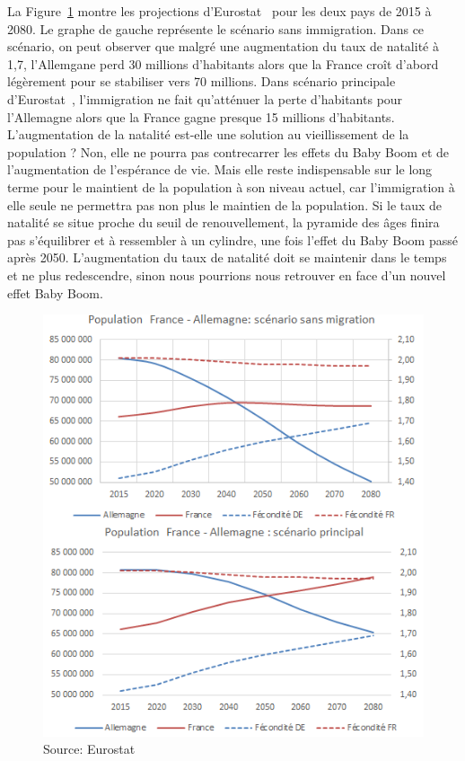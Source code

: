 La Figure~\ref{FR-DE_natalite.png} montre les projections d’Eurostat~\citep{eurostat_europop13} pour les deux pays de 2015 à 2080. Le graphe de gauche représente le scénario sans immigration. Dans ce scénario, on peut observer que malgré une augmentation du taux de natalité à 1,7, l’Allemgane perd 30 millions d’habitants alors que la France croît d’abord légèrement pour se stabiliser vers 70 millions. Dans scénario principale d'Eurostat~\citep{eurostat_europop13}, l'immigration ne fait qu’atténuer la perte d’habitants pour l’Allemagne alors que la France gagne presque 15 millions d’habitants. L’augmentation de la natalité est-elle une solution au vieillissement de la population ? Non, elle ne pourra pas contrecarrer les effets du Baby Boom et de l’augmentation de l’espérance de vie. Mais elle reste indispensable sur le long terme pour le maintient de la population à son niveau actuel, car l’immigration à elle seule ne permettra pas non plus le maintien de la population. Si le taux de natalité se situe proche du seuil de renouvellement, la pyramide des âges finira pas s'équilibrer et à ressembler à un cylindre, une fois l’effet du Baby Boom passé après 2050. L’augmentation du taux de natalité doit se maintenir dans le temps et ne plus redescendre, sinon nous pourrions nous retrouver en face d’un nouvel effet Baby Boom. 
\newpage
\begin{figure}[h!]
    \begin{center}
        \includegraphics[scale=0.70]{document/FR-DE_natalite.png}
        \caption{Source: Eurostat~\citep{eurostat_europop13}}
        \label{FR-DE_natalite.png}
    \end{center}
\end{figure}

